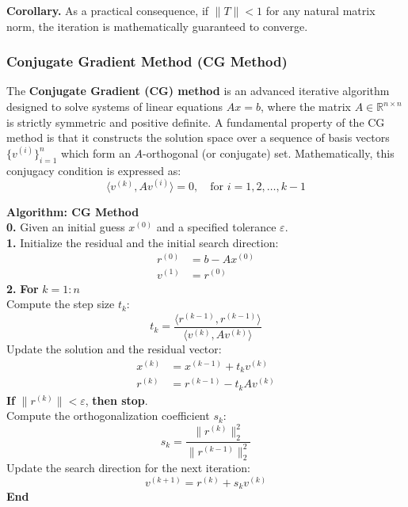 \documentclass[12pt, a4paper]{article}
\theoremstyle{break}
\begin{document}
\noindent \textbf{Corollary.} As a practical consequence, if $\|T\| < 1$ for any natural matrix norm, the iteration is mathematically guaranteed to converge.

\subsubsection{Conjugate Gradient Method (CG Method)}
The \textbf{Conjugate Gradient (CG) method} is an advanced iterative algorithm designed to solve systems of linear equations $Ax = b$, where the matrix $A \in \mathbb{R}^{n \times n}$ is strictly symmetric and positive definite.
A fundamental property of the CG method is that it constructs the solution space over a sequence of basis vectors $\{v^{(i)}\}_{i=1}^n$ which form an $A$-orthogonal (or conjugate) set.
Mathematically, this conjugacy condition is expressed as:
\begin{equation*}
    \langle v^{(k)}, A v^{(i)} \rangle = 0, \quad \text{for } i = 1, 2, \dots, k-1
\end{equation*}

\vspace{0.3cm}
\noindent \textbf{Algorithm: CG Method} \\
\textbf{0.} Given an initial guess $x^{(0)}$ and a specified tolerance $\varepsilon$.
\\
\textbf{1.} Initialize the residual and the initial search direction:
\begin{align*}
    r^{(0)} &= b - A x^{(0)} \\
    v^{(1)} &= r^{(0)}
\end{align*}
\textbf{2.} \textbf{For} $k = 1 : n$ \\
\hspace*{1em} Compute the step size $t_k$:
\begin{equation*}
    t_k = \frac{\langle r^{(k-1)}, r^{(k-1)} \rangle}{\langle v^{(k)}, A v^{(k)} \rangle}
\end{equation*}
\hspace*{1em} Update the solution and the residual vector:
\begin{align*}
    x^{(k)} &= x^{(k-1)} + t_k v^{(k)} \\
    r^{(k)} &= r^{(k-1)} - t_k A v^{(k)}
\end{align*}
\hspace*{1em} \textbf{If} $\|r^{(k)}\| < \varepsilon$, \textbf{then stop}. \\
\hspace*{1em} Compute the orthogonalization coefficient $s_k$:
\begin{equation*}
    s_k = \frac{\|r^{(k)}\|_2^2}{\|r^{(k-1)}\|_2^2}
\end{equation*}
\hspace*{1em} Update the search direction for the next iteration:
\begin{equation*}
    v^{(k+1)} = r^{(k)} + s_k v^{(k)}
\end{equation*}
\textbf{End}
\end{document}
